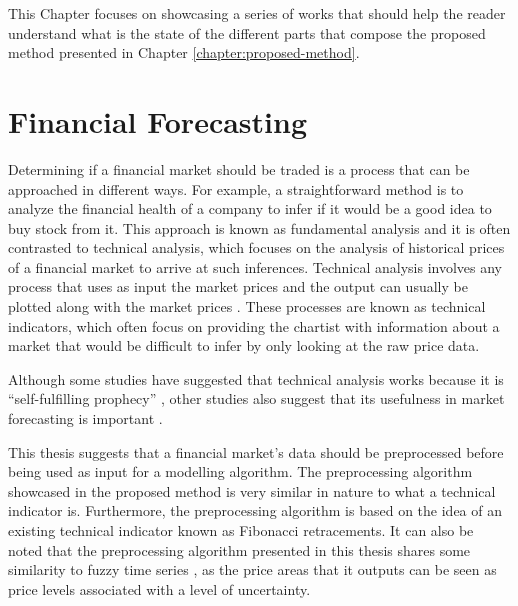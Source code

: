 


This Chapter focuses on showcasing a series of works that should help the reader
understand what is the state of the different parts that compose the proposed
method presented in Chapter \ref{chapter:proposed-method}.

\section{Financial Forecasting}
\label{section:financial-forecasting}

Determining if a financial market should be traded is a process that can be
approached in different ways. For example, a straightforward method is to
analyze the financial health of a company to infer if it would be a good idea to
buy stock from it. This approach is known as fundamental analysis
\cite{Martinez-Jaramillo2009} and it is often contrasted to technical analysis,
which focuses on the analysis of historical prices of a financial market to
arrive at such inferences. Technical analysis involves any process that uses as
input the market prices and the output can usually be plotted along with the
market prices \cite{Achelis2000}. These processes are known as technical
indicators, which often focus on providing the chartist with information about a
market that would be difficult to infer by only looking at the raw price data.

Although some studies have suggested that technical analysis works because it is
``self-fulfilling prophecy'' \cite{Salganik2008} \cite{Fund1992}, other studies
also suggest that its usefulness in market forecasting is important
\cite{Kadiri2015} \cite{Fund1992}.

This thesis suggests that a financial market's data should be preprocessed
before being used as input for a modelling algorithm. The preprocessing
algorithm showcased in the proposed method is very similar in nature to what a
technical indicator is. Furthermore, the preprocessing algorithm is based on the
idea of an existing technical indicator known as Fibonacci retracements. It can
also be noted that the preprocessing algorithm presented in this thesis shares
some similarity to fuzzy time series \cite{Cai2013}, as the price areas that it
outputs can be seen as price levels associated with a level of uncertainty.

